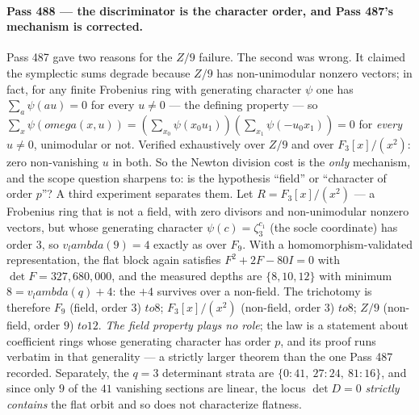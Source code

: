 \documentclass[12pt,a4paper]{article}
\def\mathbb#1{#1}%
\def\textbf#1{#1}%
\def\omega{omega}%
\def\lambda{lambda}%
\def\to{ to }%
\theoremstyle{definition}
\newcommand{\FF}{\mathbb{F}}
\newcommand{\ZZ}{\mathbb{Z}}
\begin{document}
\paragraph{Pass 488 --- the discriminator is the character order, and Pass 487's
mechanism is corrected.}
Pass 487 gave two reasons for the $\ZZ/9$ failure.  \textbf{The second was
wrong.}  It claimed the symplectic sums degrade because $\ZZ/9$ has
non-unimodular nonzero vectors; in fact, for any finite Frobenius ring with
generating character $\psi$ one has $\sum_a\psi(au)=0$ for every $u\neq0$ ---
the defining property --- so
$\sum_x\psi(\omega(x,u))=(\sum_{x_0}\psi(x_0u_1))(\sum_{x_1}\psi(-u_0x_1))=0$
for \emph{every} $u\neq0$, unimodular or not.  Verified exhaustively over
$\ZZ/9$ and over $\FF_3[x]/(x^2)$: zero non-vanishing $u$ in both.  So the
Newton division cost is the \emph{only} mechanism, and the scope question
sharpens to: is the hypothesis ``field'' or ``character of order $p$''?
A third experiment separates them.  Let $R=\FF_3[x]/(x^2)$ --- a Frobenius ring
that is \textbf{not a field}, with zero divisors and non-unimodular nonzero
vectors, but whose generating character $\psi(c)=\zeta_3^{c_1}$ (the socle
coordinate) has order $3$, so $v_\lambda(9)=4$ exactly as over $\FF_9$.  With a
homomorphism-validated representation, the flat block again satisfies
$F^2+2F-80I=0$ with $\det F=327{,}680{,}000$, and the measured depths are
$\{8,10,12\}$ with minimum $8=v_\lambda(q)+4$: \textbf{the $+4$ survives over a
non-field}.  The trichotomy is therefore $\FF_9$ (field, order $3$) $\to8$;
$\FF_3[x]/(x^2)$ (non-field, order $3$) $\to8$; $\ZZ/9$ (non-field, order $9$)
$\to12$.  \emph{The field property plays no role}; the law is a statement about
coefficient rings whose generating character has order $p$, and its proof runs
verbatim in that generality --- a strictly larger theorem than the one Pass 487
recorded.  Separately, the $q=3$ determinant strata are
$\{0:41,\ 27:24,\ 81:16\}$, and since only $9$ of the $41$ vanishing sections
are linear, the locus $\det D=0$ \emph{strictly contains} the flat orbit and so
does not characterize flatness.
\end{document}
